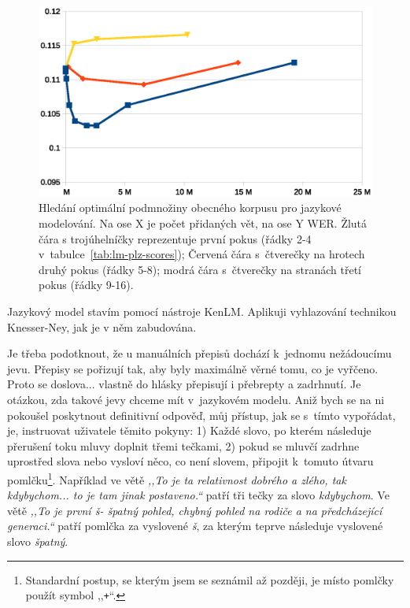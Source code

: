 \begin{figure}[htpb]
\includegraphics[scale=0.9]{rc/lm-plz-scores.eps}
\caption{
  Hledání optimální podmnožiny obecného korpusu pro jazykové modelování. Na ose
  X je počet přidaných vět, na ose Y WER. Žlutá čára s trojúhelníčky
  reprezentuje první pokus (řádky 2-4 v~tabulce~\ref{tab:lm-plz-scores});
  Červená čára s~čtverečky na hrotech druhý pokus (řádky 5-8); modrá čára
  s~čtverečky na stranách třetí pokus (řádky 9-16).
}
\label{fig:lm-plz-scores}
\end{figure}

Jazykový model stavím pomocí nástroje KenLM\cite{heafield2011kenlm}. Aplikuji
vyhlazování technikou Knesser-Ney\cite{chen1999empirical}, jak je v něm
zabudována.

Je třeba podotknout, že u manuálních přepisů dochází k~jednomu
nežádoucímu jevu. Přepisy se pořizují tak, aby byly maximálně věrné tomu, co je
vyřčeno. Proto se doslova... vlastně do hlásky přepisují i přebrepty a zadrhnutí.
Je otázkou, zda takové jevy chceme mít v~jazykovém modelu. Aniž bych se na ni
pokoušel poskytnout definitivní odpověď, můj přístup, jak se s~tímto vypořádat,
je, instruovat uživatele těmito pokyny: 1) Každé slovo, po kterém následuje přerušení toku
mluvy doplnit třemi tečkami,
2) pokud se mluvčí zadrhne uprostřed slova nebo vysloví něco, co není slovem,
připojit k~tomuto útvaru pomlčku\footnote{Standardní postup, se kterým jsem se
seznámil až později, je místo pomlčky použít symbol ,,\texttt{+}``.}. Například ve větě {\em ,,To je ta relativnost
dobrého a zlého, tak kdybychom... to je tam jinak postaveno.``} patří tři tečky
za slovo {\em kdybychom}. Ve větě {\em ,,To je první š- špatný pohled, chybný pohled na rodiče a na
předcházející generaci.``} patří pomlčka za vyslovené {\em š}, za kterým
teprve následuje vyslovené slovo {\em špatný}.

